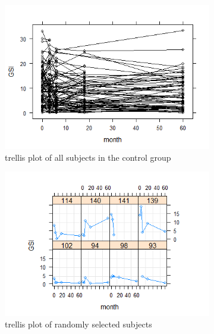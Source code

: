 \begin{figure}[H]
\begin{subfigure}{.33\textwidth}
  \centering
  \includegraphics[width=1\linewidth]{../../plots/trellis_control.png}
  \caption{trellis plot of all subjects in the control group}
\end{subfigure}
\begin{subfigure}{.33\textwidth}
  \centering
  \includegraphics[width=1\linewidth]{../../plots/trellis_subset_control.png}
  \caption{trellis plot of randomly selected subjects}
\end{subfigure}
\begin{subfigure}{.33\textwidth}
  \centering

\end{subfigure}
\end{figure}
